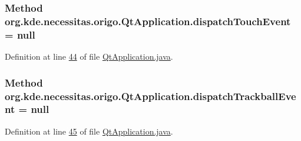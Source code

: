 \hypertarget{classorg_1_1kde_1_1necessitas_1_1origo_1_1_qt_application_af2295829d67b0f84d5bc349c583a2796}{
\subsubsection[{dispatch\-Touch\-Event}]{\setlength{\rightskip}{0pt plus 5cm}Method org.\-kde.\-necessitas.\-origo.\-Qt\-Application.\-dispatch\-Touch\-Event = null\hspace{0.3cm}{\ttfamily [static]}}}\label{d0/da0/classorg_1_1kde_1_1necessitas_1_1origo_1_1_qt_application_af2295829d67b0f84d5bc349c583a2796}


Definition at line \hyperlink{_qt_application_8java_source_l00044}{44} of file \hyperlink{_qt_application_8java_source}{Qt\-Application.\-java}.

\hypertarget{classorg_1_1kde_1_1necessitas_1_1origo_1_1_qt_application_a82788f38435ef4c08181497d41acaf69}{
\subsubsection[{dispatch\-Trackball\-Event}]{\setlength{\rightskip}{0pt plus 5cm}Method org.\-kde.\-necessitas.\-origo.\-Qt\-Application.\-dispatch\-Trackball\-Event = null\hspace{0.3cm}{\ttfamily [static]}}}\label{d0/da0/classorg_1_1kde_1_1necessitas_1_1origo_1_1_qt_application_a82788f38435ef4c08181497d41acaf69}


Definition at line \hyperlink{_qt_application_8java_source_l00045}{45} of file \hyperlink{_qt_application_8java_source}{Qt\-Application.\-java}.

